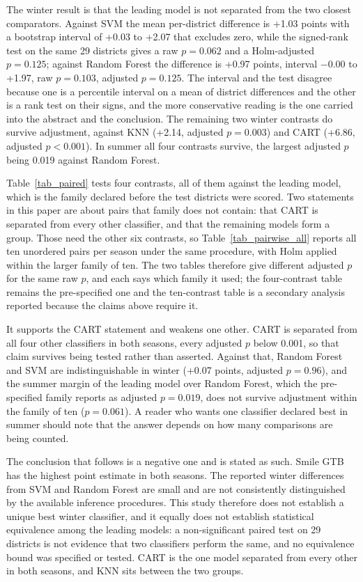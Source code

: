 \documentclass[conference]{IEEEtran}
\begin{document}
The winter result is that the leading model is not separated from the two closest comparators. Against SVM the mean per-district difference is +1.03 points with a bootstrap interval of +0.03 to +2.07 that excludes zero, while the signed-rank test on the same 29 districts gives a raw $p=0.062$ and a Holm-adjusted $p=0.125$; against Random Forest the difference is +0.97 points, interval $-0.00$ to +1.97, raw $p=0.103$, adjusted $p=0.125$. The interval and the test disagree because one is a percentile interval on a mean of district differences and the other is a rank test on their signs, and the more conservative reading is the one carried into the abstract and the conclusion. The remaining two winter contrasts do survive adjustment, against KNN (+2.14, adjusted $p=0.003$) and CART (+6.86, adjusted $p<0.001$). In summer all four contrasts survive, the largest adjusted $p$ being 0.019 against Random Forest.

Table~\ref{tab_paired} tests four contrasts, all of them against the leading model, which is the family declared before the test districts were scored. Two statements in this paper are about pairs that family does not contain: that CART is separated from every other classifier, and that the remaining models form a group. Those need the other six contrasts, so Table~\ref{tab_pairwise_all} reports all ten unordered pairs per season under the same procedure, with Holm applied within the larger family of ten. The two tables therefore give different adjusted $p$ for the same raw $p$, and each says which family it used; the four-contrast table remains the pre-specified one and the ten-contrast table is a secondary analysis reported because the claims above require it.

It supports the CART statement and weakens one other. CART is separated from all four other classifiers in both seasons, every adjusted $p$ below 0.001, so that claim survives being tested rather than asserted. Against that, Random Forest and SVM are indistinguishable in winter (+0.07 points, adjusted $p=0.96$), and the summer margin of the leading model over Random Forest, which the pre-specified family reports as adjusted $p=0.019$, does not survive adjustment within the family of ten ($p=0.061$). A reader who wants one classifier declared best in summer should note that the answer depends on how many comparisons are being counted.

The conclusion that follows is a negative one and is stated as such. Smile GTB has the highest point estimate in both seasons. The reported winter differences from SVM and Random Forest are small and are not consistently distinguished by the available inference procedures. This study therefore does not establish a unique best winter classifier, and it equally does not establish statistical equivalence among the leading models: a non-significant paired test on 29 districts is not evidence that two classifiers perform the same, and no equivalence bound was specified or tested. CART is the one model separated from every other in both seasons, and KNN sits between the two groups.
\end{document}

